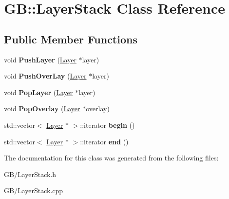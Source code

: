 \hypertarget{class_g_b_1_1_layer_stack}{}\section{GB\+::Layer\+Stack Class Reference}
\label{class_g_b_1_1_layer_stack}
\subsection*{Public Member Functions}
\begin{DoxyCompactItemize}
\item 
\mbox{\label{class_g_b_1_1_layer_stack_a310e9a2c69321fb76c76a9df4660333e}} 
void {\bfseries Push\+Layer} (\mbox{\hyperlink{class_g_b_1_1_layer}{Layer}} $\ast$layer)
\item 
\mbox{\label{class_g_b_1_1_layer_stack_aa5f7407df319048cf7a3d967253b66b9}} 
void {\bfseries Push\+Over\+Lay} (\mbox{\hyperlink{class_g_b_1_1_layer}{Layer}} $\ast$layer)
\item 
\mbox{\label{class_g_b_1_1_layer_stack_a0ae7fe027ff534e4fab0ce2156770da0}} 
void {\bfseries Pop\+Layer} (\mbox{\hyperlink{class_g_b_1_1_layer}{Layer}} $\ast$layer)
\item 
\mbox{\label{class_g_b_1_1_layer_stack_a3f2b89b4afa003737a4eb93798f571da}} 
void {\bfseries Pop\+Overlay} (\mbox{\hyperlink{class_g_b_1_1_layer}{Layer}} $\ast$overlay)
\item 
\mbox{\label{class_g_b_1_1_layer_stack_a27d194c32f2cb9bb799cb70187b5f3ec}} 
std\+::vector$<$ \mbox{\hyperlink{class_g_b_1_1_layer}{Layer}} $\ast$ $>$\+::iterator {\bfseries begin} ()
\item 
\mbox{\label{class_g_b_1_1_layer_stack_a516c9992dc13673697ef756a8ff4c733}} 
std\+::vector$<$ \mbox{\hyperlink{class_g_b_1_1_layer}{Layer}} $\ast$ $>$\+::iterator {\bfseries end} ()
\end{DoxyCompactItemize}


The documentation for this class was generated from the following files\+:\begin{DoxyCompactItemize}
\item 
G\+B/Layer\+Stack.\+h\item 
G\+B/Layer\+Stack.\+cpp\end{DoxyCompactItemize}
